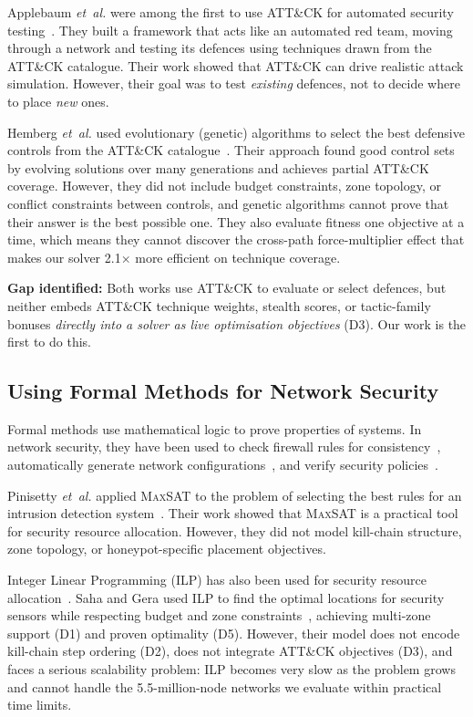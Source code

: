 \documentclass[journal]{IEEEtran}
\newcommand{\etal}{\emph{et~al.}}
\newcommand{\maxsat}{\textsc{MaxSAT}}
\begin{document}
Applebaum \etal{} were among the first to use ATT\&CK for
automated security testing~\cite{applebaum2016}.
They built a framework that acts like an automated red team,
moving through a network and testing its defences using
techniques drawn from the ATT\&CK catalogue.
Their work showed that ATT\&CK can drive realistic attack
simulation. However, their goal was to test \emph{existing}
defences, not to decide where to place \emph{new} ones.

Hemberg \etal{} used evolutionary (genetic) algorithms to
select the best defensive controls from the ATT\&CK
catalogue~\cite{hemberg2020}.
Their approach found good control sets by evolving solutions
over many generations and achieves partial ATT\&CK coverage.
However, they did not include budget constraints, zone
topology, or conflict constraints between controls, and
genetic algorithms cannot prove that their answer is the
best possible one.
They also evaluate fitness one objective at a time, which
means they cannot discover the cross-path force-multiplier
effect that makes our solver 2.1$\times$ more efficient on
technique coverage.

\textbf{Gap identified:} Both works use ATT\&CK to evaluate
or select defences, but neither embeds ATT\&CK technique
weights, stealth scores, or tactic-family bonuses
\emph{directly into a solver as live optimisation objectives}
(D3).
Our work is the first to do this.

\subsection{Using Formal Methods for Network Security}

Formal methods use mathematical logic to prove properties of
systems.
In network security, they have been used to check firewall
rules for consistency~\cite{al2011}, automatically generate
network configurations~\cite{jeffrey2009}, and verify
security policies~\cite{fisler2005}.

Pinisetty \etal{} applied \maxsat{} to the problem of
selecting the best rules for an intrusion detection
system~\cite{pinisetty2017}.
Their work showed that \maxsat{} is a practical tool for
security resource allocation.
However, they did not model kill-chain structure, zone
topology, or honeypot-specific placement objectives.

Integer Linear Programming (ILP) has also been used for
security resource allocation~\cite{saha2015,bozorgi2010}.
Saha and Gera used ILP to find the optimal locations for
security sensors while respecting budget and zone
constraints~\cite{saha2015}, achieving multi-zone support
(D1) and proven optimality (D5).
However, their model does not encode kill-chain step
ordering (D2), does not integrate ATT\&CK objectives (D3),
and faces a serious scalability problem: ILP becomes very slow
as the problem grows and cannot handle the 5.5-million-node
networks we evaluate within practical time limits.
\end{document}
